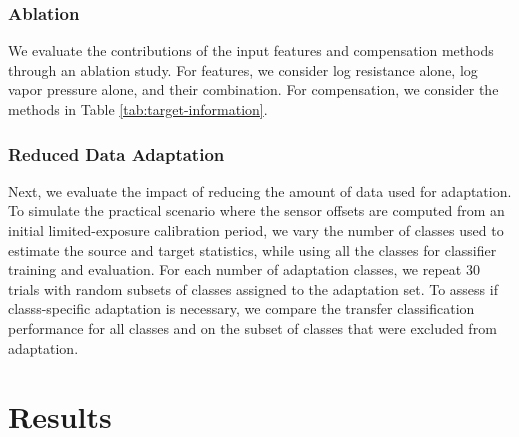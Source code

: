 \documentclass[conference]{IEEEtran}
\begin{document}
\subsubsection{Ablation}
We evaluate the contributions of the input features and compensation methods through an ablation study. For features, we consider log resistance alone, log vapor pressure alone, and their combination. For compensation, we consider the methods in Table \ref{tab:target-information}.

\subsubsection{Reduced Data Adaptation}
Next, we evaluate the impact of reducing the amount of data used for adaptation. To simulate the practical scenario where the sensor offsets are computed from an initial limited-exposure calibration period, we vary the number of classes used to estimate the source and target statistics, while using all the classes for classifier training and evaluation. For each number of adaptation classes, we repeat 30 trials with random subsets of classes assigned to the adaptation set. To assess if classs-specific adaptation is necessary, we compare the transfer classification performance for all classes and on the subset of classes that were excluded from adaptation.

%

\section{Results}
\end{document}
